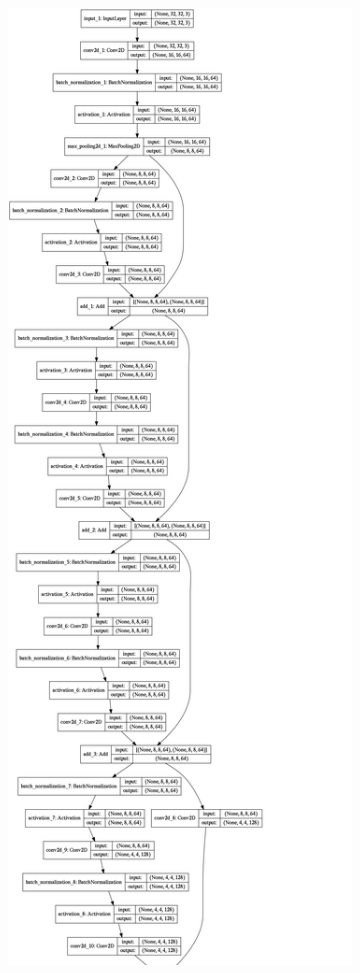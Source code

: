 \begin{figure}[ht]
    \centering
    \begin{subfigure}{.24\linewidth}
    \centering
        \includegraphics[scale=.1]{graphics/model_cropped_0.png}

\end{subfigure}
\end{figure}
